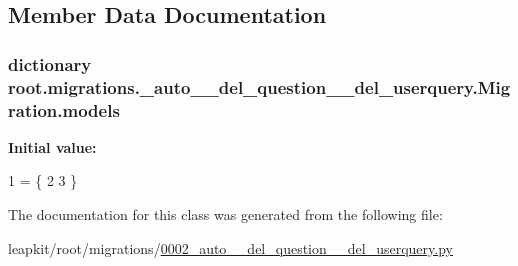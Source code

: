 \subsection{Member Data Documentation}
\hypertarget{classroot_1_1migrations_1_10002__auto____del__question____del__userquery_1_1_migration_a76a9bf8a7b9e7f4ccc5345d06fc13ec3}{
\subsubsection[{models}]{\setlength{\rightskip}{0pt plus 5cm}dictionary root.\-migrations.\-\_\-auto\-\_\-\-\_\-del\-\_\-question\-\_\-\-\_\-del\-\_\-userquery.\-Migration.\-models\hspace{0.3cm}{\ttfamily [static]}}}\label{classroot_1_1migrations_1_10002__auto____del__question____del__userquery_1_1_migration_a76a9bf8a7b9e7f4ccc5345d06fc13ec3}
{\bfseries Initial value\-:}
\begin{DoxyCode}
1 = \{
2         
3     \}
\end{DoxyCode}


The documentation for this class was generated from the following file\-:\begin{DoxyCompactItemize}
\item 
leapkit/root/migrations/\hyperlink{0002__auto____del__question____del__userquery_8py}{0002\-\_\-auto\-\_\-\-\_\-del\-\_\-question\-\_\-\-\_\-del\-\_\-userquery.\-py}\end{DoxyCompactItemize}
